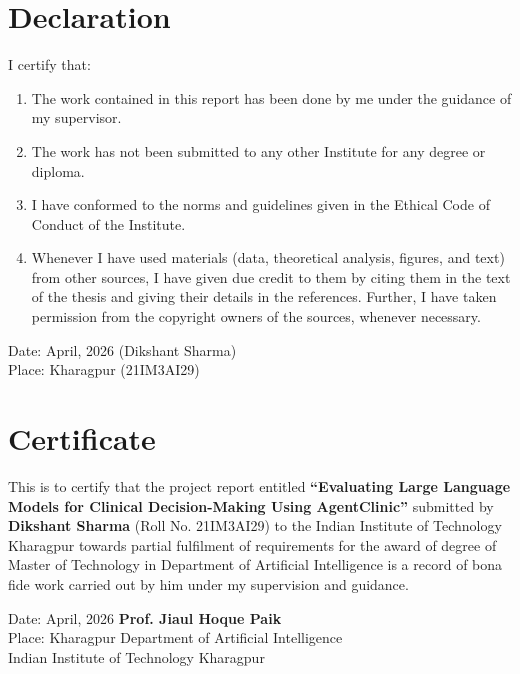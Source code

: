 \documentclass[12pt, a4paper, twoside]{report}
\begin{document}

\chapter*{Declaration}
I certify that:
\begin{enumerate}
    \item[(a)] The work contained in this report has been done by me under the guidance of my supervisor.
    \item[(b)] The work has not been submitted to any other Institute for any degree or diploma.
    \item[(c)] I have conformed to the norms and guidelines given in the Ethical Code of Conduct of the Institute.
    \item[(d)] Whenever I have used materials (data, theoretical analysis, figures, and text) from other sources, I have given due credit to them by citing them in the text of the thesis and giving their details in the references. Further, I have taken permission from the copyright owners of the sources, whenever necessary.
\end{enumerate}

\vspace{2cm}
\noindent Date: April, 2026 \hfill (Dikshant Sharma) \\
\noindent Place: Kharagpur \hfill (21IM3AI29)

\chapter*{Certificate}
This is to certify that the project report entitled \textbf{``Evaluating Large Language Models for Clinical Decision-Making Using AgentClinic''} submitted by \textbf{Dikshant Sharma} (Roll No. 21IM3AI29) to the Indian Institute of Technology Kharagpur towards partial fulfilment of requirements for the award of degree of Master of Technology in Department of Artificial Intelligence is a record of bona fide work carried out by him under my supervision and guidance.

\vspace{3cm}
\noindent Date: April, 2026 \hfill \textbf{Prof. Jiaul Hoque Paik} \\
\noindent Place: Kharagpur \hfill Department of Artificial Intelligence \\
\null \hfill Indian Institute of Technology Kharagpur
\end{document}
